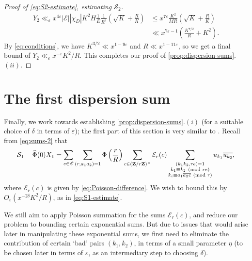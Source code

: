 \documentclass[reqno,11pt]{amsart}
\theoremstyle{definition}
\theoremstyle{remark}
\numberwithin{equation}{section}
\newcommand{\Z}{\mathbf{Z}}
\newcommand{\msE}{\mathscr{E}}
\newcommand{\mE}{\mathcal{E}}
\newcommand{\mS}{\mathcal{S}}
\newcommand{\eps}{\varepsilon}
\renewcommand{\bar}{\overline}
\renewcommand{\hat}{\widehat}
\renewcommand{\pmod}[1]{\ (\textnormal{mod } #1)}
\begin{document}
\begin{proof}[Proof of \cref{eq:S2-estimate}, estimating $\mS_2$]
\[
\begin{aligned}
    Y_2 \ll_\eps x^{4\eps}
    |\msE| |\chi_D| K^2 H  \frac{1}{E} \frac{1}{R^2} \left(\sqrt{K} + \frac{R}{K} \right)
    &\le 
    x^{7\eps} \frac{K^2}{MR} \left(\sqrt{K} + \frac{R}{K} \right)
    \\
    &\ll 
    x^{7\eps - 1} \left(\frac{K^{7/2}}{R} + K^2\right).
\end{aligned}
\]
By \cref{eq:conditions}, we have $K^{3/2} \ll x^{1-9\eps}$ and $R \ll x^{1-11\eps}$, so we get a final bound of $Y_2 \ll_\eps x^{-\eps} K^2 / R$. This completes our proof of \cref{prop:dispersion-sums}.$(ii)$.
\end{proof}




\section{The first dispersion sum}
Finally, we work towards establishing \cref{prop:dispersion-sums}.$(i)$ (for a suitable choice of $\delta$ in terms of $\eps$); the first part of this section is very similar to \cite[\S 3.4]{drappeau2015theoremes}. Recall from \cref{eq:sums-2} that
\[
    \mS_1 - \hat{\Phi}(0) X_1 = 
    \sum_{e \in \msE} \sum_{(r,a_1a_2)=1} \Phi\left(\frac{r}{R}\right) \sum_{c \in (\Z/r\Z)^\times} \mE_r(c) \sum_{\substack{(k_1k_2,re)=1 \\ k_1 \equiv k_2 \pmod{re} \\ k_i \equiv a_1\bar{a_2c} \pmod{r}}} u_{k_1} \bar{u_{k_2}},
\]
where $\mE_r(c)$ is given by \cref{eq:Poisson-difference}. We wish to bound this by $O_\eps(x^{-2\delta} K^2 / R)$, as in \cref{eq:S1-estimate}.

We still aim to apply Poisson summation for the sums $\mE_r(c)$, and reduce our problem to bounding certain exponential sums. But due to issues that would arise later in manipulating these exponential sums, we first need to eliminate the contribution of certain `bad' pairs $(k_1, k_2)$, in terms of a small parameter $\eta$ (to be chosen later in terms of $\eps$, as an intermediary step to choosing $\delta$). 
\end{document}

